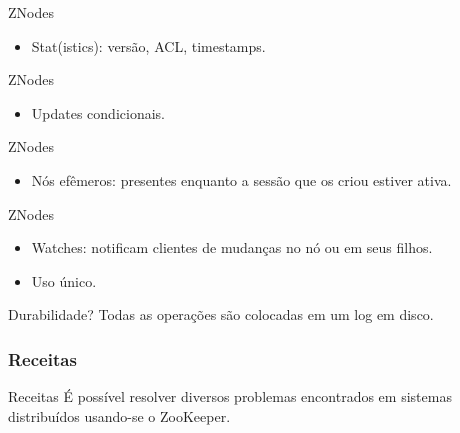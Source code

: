 
\begin{frame}{ZNodes}
\begin{itemize}
	\item Stat(istics): versão, ACL, timestamps.
\end{itemize}
\end{frame}


\begin{frame}{ZNodes}
\begin{itemize}
	\item Updates condicionais.
\end{itemize}
\end{frame}


\begin{frame}{ZNodes}
\begin{itemize}
	\item Nós efêmeros: presentes enquanto a sessão que os criou estiver ativa.
\end{itemize}
\end{frame}


\begin{frame}{ZNodes}
\begin{itemize}
	\item Watches: notificam clientes de mudanças no nó ou em seus filhos.
	\item Uso único.
\end{itemize}
\end{frame}


\begin{frame}{Durabilidade?}
Todas as operações são colocadas em um log em disco.
\end{frame}


\subsubsection{Receitas}
\begin{frame}{Receitas}
É possível resolver diversos problemas encontrados em sistemas distribuídos usando-se o ZooKeeper.
\end{frame}

